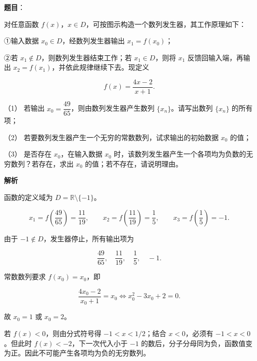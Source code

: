 \begin{answer}

\textbf{题目}：

对任意函数 $f(x)$，$x\in D$，可按图示构造一个数列发生器，其工作原理如下：

①输入数据 $x_0\in D$，经数列发生器输出 $x_1=f(x_0)$；

②若 $x_1\notin D$，则数列发生器结束工作；若 $x_1\in D$，则将 $x_1$ 反馈回输入端，再输出 $x_2=f(x_1)$，并依此规律继续下去。现定义

\nopagebreak[4]
\[
f(x)=\frac{4x-2}{x+1}.
\]
\nopagebreak[4]
\begin{center}\end{center}
\nopagebreak[4]
（1） 若输出 $x_0=\dfrac{49}{65}$，则由数列发生器产生数列 $\{x_n\}$。请写出数列 $\{x_n\}$ 的所有项；

（2） 若要数列发生器产生一个无穷的常数数列，试求输出的初始数据 $x_0$ 的值；

（3） 是否存在 $x_0$，在输入数据 $x_0$ 时，该数列发生器产生一个各项均为负数的无穷数列？若存在，求出 $x_0$ 的值；若不存在，请说明理由。

\textbf{解析}

函数的定义域为 $D=\mathbb R\setminus\{-1\}$。


\nopagebreak[4]
\[
x_1=f\left(\frac{49}{65}\right)=\frac{11}{19},\qquad
x_2=f\left(\frac{11}{19}\right)=\frac15,\qquad
x_3=f\left(\frac15\right)=-1.
\]

由于 $-1\notin D$，发生器停止，所有输出项为

\nopagebreak[4]
\[
\frac{49}{65},\quad\frac{11}{19},\quad\frac15,\quad-1.
\]


常数数列要求 $f(x_0)=x_0$，即

\nopagebreak[4]
\[
\frac{4x_0-2}{x_0+1}=x_0
\Longleftrightarrow x_0^2-3x_0+2=0.
\]

故 $x_0=1$ 或 $x_0=2$。


若 $f(x)<0$，则由分式符号得 $-1<x<1/2$；结合 $x<0$，必须有 $-1<x<0$。但此时 $f(x)<-2$，下一次代入小于 $-1$ 的数后，分子分母同为负，函数值变为正。因此不可能产生各项均为负的无穷数列。




\end{answer}